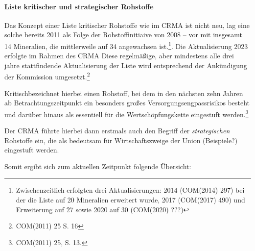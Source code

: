 \documentclass[12pt,a4paper,oneside]{book} %
\begin{document}

\paragraph{Liste kritischer und strategischer Rohstoffe}

Das Konzept einer Liste kritischer Rohstoffe wie im CRMA ist nicht neu, lag eine solche bereits 2011 als Folge der Rohstoffinitiaive von 2008 -- vor mit insgesamt 14 Mineralien, die mittlerweile auf 34 angewachsen ist.\footnote{Zwischenzeitlich erfolgten drei Aktualisierungen: 2014 (COM(2014) 297) bei der die Liste auf 20 Mineralien erweitert wurde, 2017 (COM(2017) 490) und Erweiterung auf 27 sowie 2020 auf 30 (COM(2020) ???)}. Die Aktualisierung 2023 erfolgte im Rahmen des CRMA%
Diese regelmäßige, aber mindestens alle drei jahre stattfindende Aktualisierung der Liste wird entsprechend der Ankündigung der Kommission umgesetzt.\footnote{COM(2011) 25 S. 16}

\glqq Kritisch\grqq bezeichnet hierbei einen Rohstoff, bei dem in den nächsten zehn Jahren ab Betrachtungszeitpunkt ein besonders großes Versorgungsengpassrisikos besteht und darüber hinaus als essentiell für die Wertschöpfungskette eingestuft werden.\footnote{COM(2011) 25, S. 13.} 

Der CRMA führte hierbei dann erstmals auch den Begriff der \textit{strategischen} Rohstoffe ein, die als bedeutsam für Wirtschaftszweige der Union (Beispiele?) eingestuft werden.

Somit ergibt sich zum aktuellen Zeitpunkt folgende Übersicht:
\end{document}
